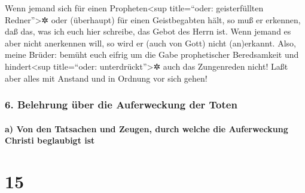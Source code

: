  Wenn jemand sich für einen Propheten\textless sup
title=``oder: geisterfüllten Redner''\textgreater✲ oder (überhaupt) für
einen Geistbegabten hält, so muß er erkennen, daß das, was ich euch hier
schreibe, das Gebot des Herrn ist.  Wenn jemand es aber
nicht anerkennen will, so wird er (auch von Gott) nicht (an)erkannt.
 Also, meine Brüder: bemüht euch eifrig um die Gabe
prophetischer Beredsamkeit und hindert\textless sup title=``oder:
unterdrückt''\textgreater✲ auch das Zungenreden nicht! 
Laßt aber alles mit Anstand und in Ordnung vor sich gehen!

\hypertarget{belehrung-uxfcber-die-auferweckung-der-toten}{%
\subsubsection{6. Belehrung über die Auferweckung der
Toten}\label{belehrung-uxfcber-die-auferweckung-der-toten}}

\hypertarget{a-von-den-tatsachen-und-zeugen-durch-welche-die-auferweckung-christi-beglaubigt-ist}{%
\paragraph{a) Von den Tatsachen und Zeugen, durch welche die
Auferweckung Christi beglaubigt
ist}\label{a-von-den-tatsachen-und-zeugen-durch-welche-die-auferweckung-christi-beglaubigt-ist}}

\hypertarget{section-14}{%
\section{15}\label{section-14}}

